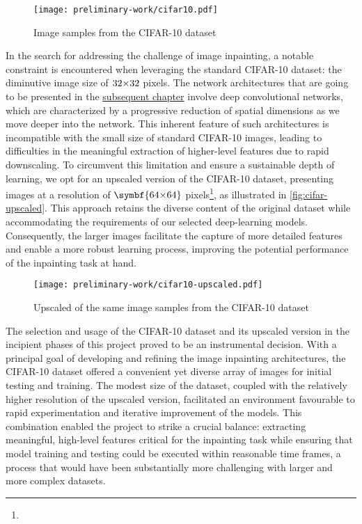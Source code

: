 \begin{figure}[ht]
    \centering
    \texttt{[image: preliminary-work/cifar10.pdf]}
    \caption{Image samples from the CIFAR-10 dataset}
    \label{fig:cifar}
\end{figure}

In the search for addressing the challenge of image inpainting, a notable constraint is encountered when leveraging the standard CIFAR-10 dataset: the diminutive image size of $32{\times}32$ pixels. The network architectures that are going to be presented in the \hyperref[section:solutions]{subsequent chapter} involve deep convolutional networks, which are characterized by a progressive reduction of spatial dimensions as we move deeper into the network. This inherent feature of such architectures is incompatible with the small size of standard CIFAR-10 images, leading to difficulties in the meaningful extraction of higher-level features due to rapid downscaling. To circumvent this limitation and ensure a sustainable depth of learning, we opt for an upscaled version of the CIFAR-10 dataset, presenting images at a resolution of $\symbf{64\stimes64}$ pixels\footnote{\scaledcifar}, as illustrated in \autoref{fig:cifar-upscaled}. This approach retains the diverse content of the original dataset while accommodating the requirements of our selected deep-learning models. Consequently, the larger images facilitate the capture of more detailed features and enable a more robust learning process, improving the potential performance of the inpainting task at hand.

\begin{figure}[ht]
    \centering
    \texttt{[image: preliminary-work/cifar10-upscaled.pdf]}
    \caption{Upscaled of the same image samples from the CIFAR-10 dataset}
    \label{fig:cifar-upscaled}
\end{figure}

The selection and usage of the CIFAR-10 dataset and its upscaled version in the incipient phases of this project proved to be an instrumental decision. With a principal goal of developing and refining the image inpainting architectures, the CIFAR-10 dataset offered a convenient yet diverse array of images for initial testing and training. The modest size of the dataset, coupled with the relatively higher resolution of the upscaled version, facilitated an environment favourable to rapid experimentation and iterative improvement of the models. This combination enabled the project to strike a crucial balance: extracting meaningful, high-level features critical for the inpainting task while ensuring that model training and testing could be executed within reasonable time frames, a process that would have been substantially more challenging with larger and more complex datasets.

